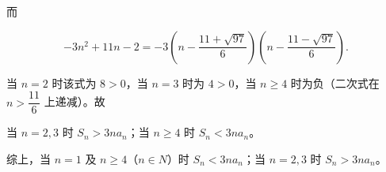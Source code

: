 \begin{answer}
而

\nopagebreak[4]
\[
-3n^{2}+11n-2=-3\left(n-\frac{11+\sqrt{97}}{6}\right)\left(n-\frac{11-\sqrt{97}}{6}\right).
\]

当 $n=2$ 时该式为 $8>0$，当 $n=3$ 时为 $4>0$，当 $n\ge 4$ 时为负（二次式在 $n>\dfrac{11}{6}$ 上递减）。故

当 $n=2,3$ 时 $S_{n}>3na_{n}$；当 $n\ge 4$ 时 $S_{n}<3na_{n}$。

综上，当 $n=1$ 及 $n\ge 4$（$n\in N$）时 $S_{n}<3na_{n}$；当 $n=2,3$ 时 $S_{n}>3na_{n}$。


\end{answer}
